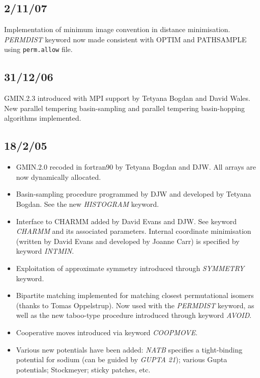 \documentclass[12pt,a4paper,dvips]{article}
\begin{document}
\subsection{2/11/07}
Implementation of minimum image convention in distance minimisation.
{\it PERMDIST} keyword now made consistent with OPTIM and PATHSAMPLE
using {\tt perm.allow} file.

\subsection{31/12/06}
GMIN.2.3 introduced with MPI support by Tetyana Bogdan and David Wales.
New parallel tempering basin-sampling and
parallel tempering basin-hopping algorithms implemented.

\subsection{18/2/05}
\begin{itemize}
\item GMIN.2.0 recoded in fortran90 by Tetyana Bogdan and DJW. All arrays are now dynamically allocated.
\item Basin-sampling procedure programmed by DJW and developed by Tetyana Bogdan. See the new
{\it HISTOGRAM} keyword.
\item Interface to CHARMM added by David Evans and DJW. See keyword {\it CHARMM} and its associated 
parameters. Internal coordinate minimisation (written by David Evans and developed by Joanne Carr) 
is specified by keyword {\it INTMIN}.
\item Exploitation of approximate symmetry introduced through {\it SYMMETRY} keyword.
\item Bipartite matching implemented for matching closest permutational isomers
(thanks to Tomas Oppelstrup). Now used with 
the {\it PERMDIST} keyword, as well as the new taboo-type procedure introduced through keyword {\it AVOID}.
\item Cooperative moves introduced via keyword {\it COOPMOVE}.
\item Various new potentials have been added: {\it NATB} specifies a tight-binding potential
for sodium (can be guided by {\it GUPTA 21}); various Gupta potentials; Stockmeyer; sticky patches, etc.
\end{itemize}
\end{document}

